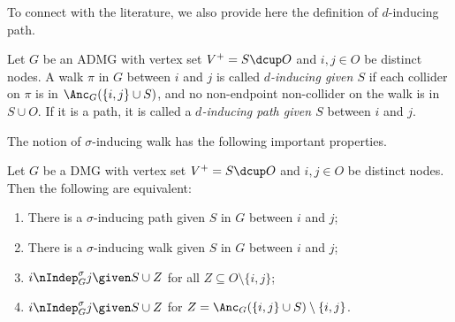 To connect with the literature, we also provide here the definition of $d$-inducing path.
\begin{Def}\label{def:d-inducing_path}
Let $G$ be an ADMG with vertex set $V^+ = S \dcup O$ and $i,j \in O$ be distinct nodes.
A walk $\pi$ in $G$ between $i$ and $j$ is called \emph{$d$-inducing given $S$} if each
collider on $\pi$ is in $\Anc_{G}(\{i,j\}\cup S)$, and no non-endpoint non-collider on the walk is in $S \cup O$.
If it is a path, it is called a \emph{$d$-inducing path given $S$} between $i$ and $j$.
\end{Def}

The notion of $\sigma$-inducing walk has the following important properties.
\begin{Prp}\label{prp:sigma-inducing_path_properties}
  Let $G$ be a DMG with vertex set $V^+ = S \dcup O$ and $i,j \in O$ be distinct nodes.
  Then the following are equivalent:
  \begin{enumerate}[label=(\roman*)]
    \item There is a $\sigma$-inducing path given $S$ in $G$ between $i$ and $j$;
    \item There is a $\sigma$-inducing walk given $S$ in $G$ between $i$ and $j$;
    \item $i \nIndep^\sigma_G j \given S \cup Z$ for all $Z \subseteq O \setminus \{i,j\}$;
    \item $i \nIndep^\sigma_G j \given S \cup Z$ for $Z = \Anc_G(\{i,j\} \cup S) \setminus \{i,j\}$.
  \end{enumerate}
\end{Prp}
